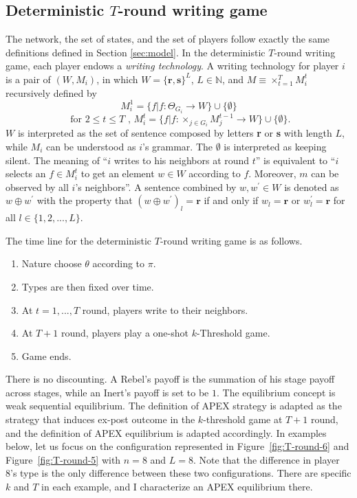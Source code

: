 \documentclass[12pt,letter]{article}
\theoremstyle{definition}
\theoremstyle{remark}
\theoremstyle{claim}
\begin{document}
  

\subsection{Deterministic $T$-round writing game}
\label{sec:writing}
The network, the set of states, and the set of players follow exactly the same definitions defined in Section \ref{sec:model}. In the deterministic $T$-round writing game, each player endows a \textit{writing technology}. A writing technology for player $i$ is a pair of $(W,M_i)$, in which $W=\{{\textbf{r}},\textbf{s}\}^L$, $L\in \mathbb{N}$, and $M\equiv \times^T_{t=1}M^{t}_i$ recursively defined by
\[M^1_i=\{f|f:\Theta_{G_i}\rightarrow W\}\cup \{\emptyset\}\]
\[ \text{ for } 2\leq t \leq T\text{ , }M^{t}_i=\{f|f:\times_{j\in G_i}M^{t-1}_j\rightarrow W\}\cup \{\emptyset\}. \]
$W$ is interpreted as the set of sentence composed by letters \textbf{r} or \textbf{s} with length $L$, while $M_i$ can be understood as $i$'s grammar. The $\emptyset$ is interpreted as keeping silent. The meaning of ``$i$ writes to his neighbors at round $t$'' is equivalent to ``$i$ selects an $f\in M^t_i$ to get an element $w\in W$ according to $f$.  Moreover, $m$ can be observed by all $i$'s neighbors''. A sentence combined by $w,w^{'}\in W$ is denoted as $w\oplus w^{'}$ with the property that $(w\oplus w^{'})_l=\textbf{r}$ if and only if $w_l=\textbf{r}$ or $w^{'}_l=\textbf{r}$ for all $l\in \{1,2,...,L\}$. 

The time line for the deterministic $T$-round writing game is as follows.
\begin{enumerate}
\item Nature choose $\theta$ according to $\pi$.
\item Types are then fixed over time.
\item At $t=1,...,T$ round, players write to their neighbors. 
\item At $T+1$ round, players play a one-shot $k$-Threshold game.
\item Game ends.
\end{enumerate}

There is no discounting. A Rebel's payoff is the summation of his stage payoff across stages, while an Inert's payoff is set to be $1$. The equilibrium concept is weak sequential equilibrium. The definition of APEX strategy is adapted as the strategy that induces ex-post outcome in the $k$-threshold game at $T+1$ round, and the definition of APEX equilibrium is adapted accordingly. In examples below, let us focus on the configuration represented in Figure~\ref{fig:T-round-6} and Figure~\ref{fig:T-round-5} with $n=8$ and $L=8$. Note that the difference in player 8's type is the only difference between these two configurations. There are specific $k$ and $T$ in each example, and I characterize an APEX equilibrium there.
\end{document}

